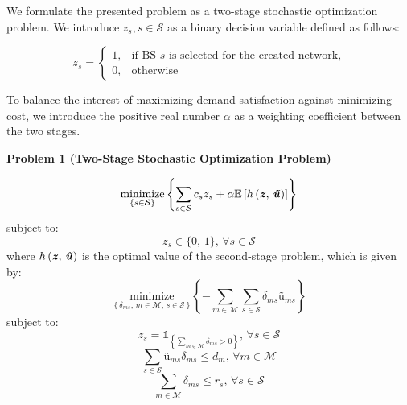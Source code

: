 \documentclass[12pt,onecolumn]{IEEEtran}
\begin{document}

We formulate the presented problem as a two-stage stochastic optimization problem.  We introduce $z_s, s \in \mathcal{S}$ as a binary decision variable defined as follows:

\[ z_s =
	\begin{cases}
		1,& \text{if BS $s$ is selected for the created network,}\\
		0,& \text{otherwise}
	\end{cases}
\]

To balance the interest of maximizing demand satisfaction against minimizing cost, we introduce the positive real number $\alpha$ as a weighting coefficient between the two stages.

\vspace{5mm}
\noindent \textbf{Problem 1 (Two-Stage Stochastic Optimization Problem)}


\begin{equation} \label{eq:P1S1}
\underset{\left\{s \in \mathcal{S}\right\}}{\text{minimize}} \left\{ \sum_{s \in \mathcal{S}} c_s z_s + \alpha \mathbb{E}\left[ h\left( \textbf{\textit{z}},\, \textbf{\textit{\~u}} \right) \right] \right\}
\end{equation}
subject to:
\begin{equation} \label{eq:P1S1C1}
z_s \in \{0,\, 1\},\, \forall s \in \mathcal{S}
\end{equation}
where $h\left( \textbf{\textit{z}},\, \textbf{\textit{\~u}} \right)$ is the optimal value of the second-stage problem, which is given by:
\begin{equation} \label{eq:P1S2}
\underset{\left\{\delta_{ms},\, m \in \mathcal{M},\, s \in \mathcal{S} \right\}}{\text{minimize}} \left\{ - \sum_{m \in \mathcal{M}} \sum_{s \in \mathcal{S}} \delta_{ms} \textit{\~u}_{ms} \right\}
\end{equation}
subject to:
\begin{equation} \label{eq:P1S2C1}
z_s = \mathbb{1}_{\left\{\sum_{m \in \mathcal{M}} \delta_{ms} > 0 \right\}},\, \forall s \in \mathcal{S}
\end{equation}
\begin{equation} \label{eq:P1S2C2}
\sum_{s \in \mathcal{S}} \textit{\~u}_{ms} \delta_{ms} \leq d_m,\, \forall m \in \mathcal{M}
\end{equation}
\begin{equation} \label{eq:P1S2C3}
\sum_{m \in \mathcal{M}} \delta_{ms} \leq r_s,\, \forall s \in \mathcal{S}
\end{equation}
\end{document}
